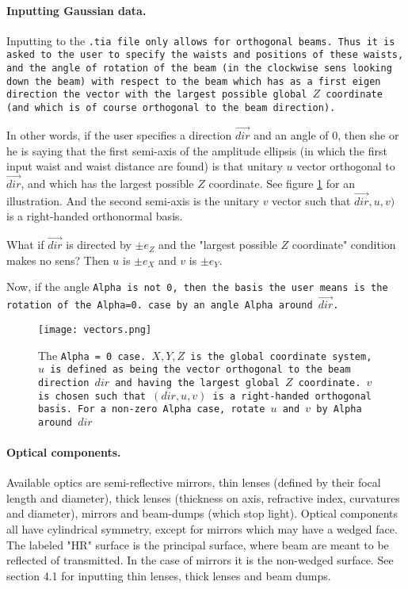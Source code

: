 \documentclass{article}
\begin{document}
\paragraph{Inputting Gaussian data.}Inputting to the \tt{.tia} file only allows for orthogonal beams. Thus it is asked to the user to specify the waists and positions of these waists, and the angle of rotation of the beam (in the clockwise sens looking down the beam) with respect to the beam which has as a first eigen direction the vector with the largest possible global $Z$ coordinate (and which is of course orthogonal to the beam direction). 

In other words, if the user specifies a direction $\vec{dir}$ and an angle of 0, then she or he is saying that the first semi-axis of the amplitude ellipsis (in which the first input waist and waist distance are found) is that unitary $u$ vector orthogonal to $\vec{dir}$, and which has the largest possible $Z$ coordinate. See figure \ref{vectors} for an illustration. And the second semi-axis is the unitary $v$ vector such that $\vec{dir}, u, v)$ is a right-handed orthonormal basis.

What if $\vec{dir}$ is directed by $\pm e_Z$ and the "largest possible $Z$ coordinate" condition makes no sens? Then $u$ is $\pm e_X$ and $v$ is $\pm e_Y$.

Now, if the angle \tt{Alpha} is not 0, then the basis the user means is the rotation of the \tt{Alpha=0.} case by an angle \tt{Alpha} around $\vec{dir}$.

\begin{figure}[h]
\begin{center}
\texttt{[image: vectors.png]}
\caption{The \tt{Alpha = 0} case. $X, Y, Z$ is the global coordinate system, $u$ is defined as being the vector orthogonal to the beam direction $dir$ and having the largest global $Z$ coordinate. $v$ is chosen such that $(dir, u, v)$ is a right-handed orthogonal basis. For a non-zero  \tt{Alpha} case, rotate $u$ and $v$ by \tt{Alpha} around $dir$}
\label{vectors}
\end{center}
\end{figure}

\paragraph{Optical components.}Available optics are semi-reflective mirrors, thin lenses (defined by their focal length and diameter), thick lenses (thickness on axis, refractive index, curvatures and diameter), mirrors and beam-dumps (which stop light). Optical components all have cylindrical symmetry, except for mirrors which may have a wedged face. The labeled "HR" surface is the principal surface, where beam are meant to be reflected of transmitted. In the case of mirrors it is the non-wedged surface. See section 4.1 for inputting thin lenses, thick lenses and beam dumps.
\end{document}
